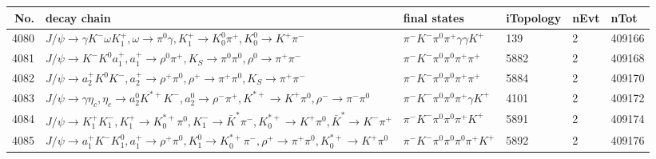 \begin{table}[htbp] 
\begin{center}
\begin{small}
\begin{tabular}{rlllll}\hline\hline
 No. & decay chain & final states &  iTopology & nEvt & nTot \\\hline
4080&$J/\psi       \rightarrow \gamma       K^{-}          \omega         K_1^{+}        , \omega          \rightarrow \pi^{0}        \gamma       , K_1^{+}         \rightarrow K_0^{0}        \pi^{+}        , K_0^{0}         \rightarrow K^{+}          \pi^{-}        $&$\pi^{-}        K^{-}          \pi^{0}        \pi^{+}        \gamma       \gamma       K^{+}          $&  139&    2&409166\\
4081&$J/\psi       \rightarrow K^{-}          K^{0}          a_{1}^{+}      , a_{1}^{+}       \rightarrow \rho^{0}      \pi^{+}        , K_{S}           \rightarrow \pi^{0}        \pi^{0}        , \rho^{0}       \rightarrow \pi^{+}        \pi^{-}        $&$\pi^{-}        K^{-}          \pi^{0}        \pi^{0}        \pi^{+}        \pi^{+}        $& 5882&    2&409168\\
4082&$J/\psi       \rightarrow a_{2}^{+}      K^{0}          K^{-}          , a_{2}^{+}       \rightarrow \rho^{+}      \pi^{0}        , \rho^{+}       \rightarrow \pi^{+}        \pi^{0}        , K_{S}           \rightarrow \pi^{+}        \pi^{-}        $&$\pi^{-}        K^{-}          \pi^{0}        \pi^{0}        \pi^{+}        \pi^{+}        $& 5884&    2&409170\\
4083&$J/\psi       \rightarrow \gamma       \eta_{c}    , \eta_{c}     \rightarrow a_{2}^{0}      K^{*+}         K^{-}          , a_{2}^{0}       \rightarrow \rho^{-}      \pi^{+}        , K^{*+}          \rightarrow K^{+}          \pi^{0}        , \rho^{-}       \rightarrow \pi^{-}        \pi^{0}        $&$\pi^{-}        K^{-}          \pi^{0}        \pi^{0}        \pi^{+}        \gamma       K^{+}          $& 4101&    2&409172\\
4084&$J/\psi       \rightarrow K_1^{+}        K_{1}^{-}      , K_1^{+}         \rightarrow K_{0}^{*+}     \pi^{0}        , K_{1}^{-}       \rightarrow \bar{K}^{*}   \pi^{-}        , K_{0}^{*+}      \rightarrow K^{+}          \pi^{0}        , \bar{K}^{*}    \rightarrow K^{-}          \pi^{+}        $&$\pi^{-}        K^{-}          \pi^{0}        \pi^{0}        \pi^{+}        K^{+}          $& 5891&    2&409174\\
4085&$J/\psi       \rightarrow a_{1}^{+}      K^{-}          K_1^{0}        , a_{1}^{+}       \rightarrow \rho^{+}      \pi^{0}        , K_1^{0}         \rightarrow K_{0}^{*+}     \pi^{-}        , \rho^{+}       \rightarrow \pi^{+}        \pi^{0}        , K_{0}^{*+}      \rightarrow K^{+}          \pi^{0}        $&$\pi^{-}        K^{-}          \pi^{0}        \pi^{0}        \pi^{0}        \pi^{+}        K^{+}          $& 5892&    2&409176\\

\end{tabular}
\end{small}
\end{center}
\end{table}

